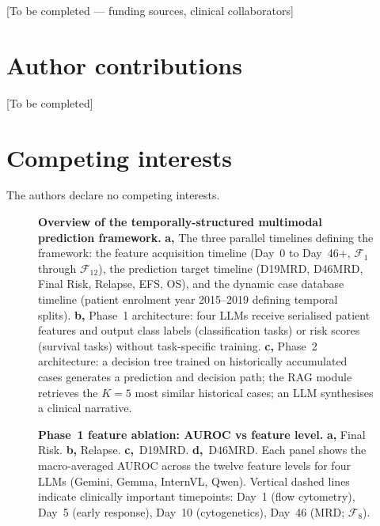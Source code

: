 \documentclass[pdflatex,sn-nature]{sn-jnl}
\begin{document}
[To be completed — funding sources, clinical collaborators]

\section*{Author contributions}

[To be completed]

\section*{Competing interests}

The authors declare no competing interests.


\begin{figure}[ht]
\caption{\textbf{Overview of the temporally-structured multimodal
prediction framework.}
\textbf{a,} The three parallel timelines defining the framework:
the feature acquisition timeline (Day~0 to Day~46+, $\mathcal{F}_1$
through $\mathcal{F}_{12}$), the prediction target timeline
(D19MRD, D46MRD, Final Risk, Relapse, EFS, OS), and the dynamic
case database timeline (patient enrolment year 2015--2019 defining
temporal splits).
\textbf{b,} Phase~1 architecture: four LLMs receive serialised patient
features and output class labels (classification tasks) or risk scores
(survival tasks) without task-specific training.
\textbf{c,} Phase~2 architecture: a decision tree trained on
historically accumulated cases generates a prediction and decision path;
the RAG module retrieves the $K=5$ most similar historical cases; an
LLM synthesises a clinical narrative.}
\label{fig:overview}
\end{figure}

\begin{figure}[ht]
\caption{\textbf{Phase~1 feature ablation: AUROC vs feature level.}
\textbf{a,} Final Risk. \textbf{b,} Relapse. \textbf{c,}~D19MRD.
\textbf{d,}~D46MRD.
Each panel shows the macro-averaged AUROC across the twelve feature
levels for four LLMs (Gemini, Gemma, InternVL, Qwen).
Vertical dashed lines indicate clinically important timepoints:
Day~1 (flow cytometry), Day~5 (early response), Day~10
(cytogenetics), Day~46 (MRD; $\mathcal{F}_8$).}
\label{fig:ablation}
\end{figure}
\end{document}
